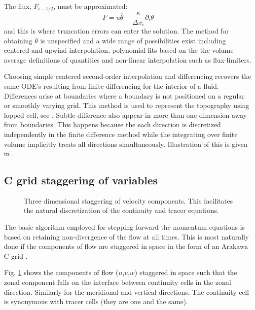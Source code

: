 The flux, $F_{i-1/2}$, must be approximated:
\begin{displaymath}
F = u \overline{\theta} - \frac{\kappa}{\Delta x_c} \partial_i \theta
\end{displaymath}
and this is where truncation errors can enter the solution. The
method for obtaining $\overline{\theta}$ is unspecified and a wide
range of possibilities exist including centered and upwind
interpolation, polynomial fits based on the the volume average
definitions of quantities and non-linear interpolation such as
flux-limiters.

Choosing simple centered second-order interpolation and differencing
recovers the same ODE's resulting from finite differencing for the
interior of a fluid. Differences arise at boundaries where a boundary
is not positioned on a regular or smoothly varying grid. This method
is used to represent the topography using lopped cell, see
\cite{Adcroft98}. Subtle difference also appear in more than one
dimension away from boundaries. This happens because the each
direction is discretized independently in the finite difference method
while the integrating over finite volume implicitly treats all
directions simultaneously. Illustration of this is given in
\cite{Adcroft02}.

\subsection{C grid staggering of variables}

\begin{figure}
\begin{center}
\end{center}
\caption{Three dimensional staggering of velocity components. This
facilitates the natural discretization of the continuity and tracer
equations. }
\label{fig:cgrid3d}
\end{figure}

The basic algorithm employed for stepping forward the momentum
equations is based on retaining non-divergence of the flow at all
times. This is most naturally done if the components of flow are
staggered in space in the form of an Arakawa C grid \cite{Arakawa70}.

Fig. \ref{fig:cgrid3d} shows the components of flow ($u$,$v$,$w$)
staggered in space such that the zonal component falls on the
interface between continuity cells in the zonal direction. Similarly
for the meridional and vertical directions.  The continuity cell is
synonymous with tracer cells (they are one and the same).



